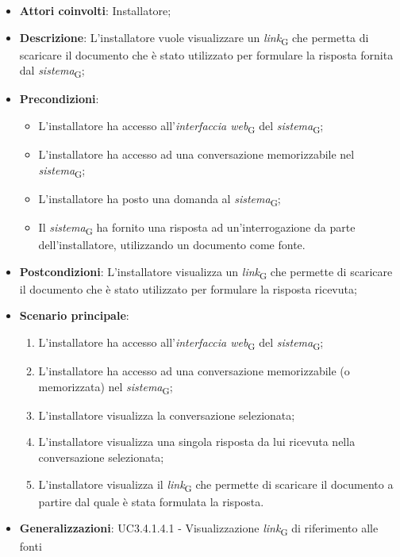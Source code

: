 \begin{itemize}
    \item \textbf{Attori coinvolti}: Installatore;
    \item \textbf{Descrizione}: L'installatore vuole visualizzare un \textit{link}\textsubscript{G} che permetta di scaricare il documento che è stato utilizzato per formulare la risposta fornita dal \textit{sistema}\textsubscript{G};
    \item \textbf{Precondizioni}: 
    \begin{itemize}
        \item L’installatore ha accesso all’\textit{interfaccia web}\textsubscript{G} del \textit{sistema}\textsubscript{G};
        \item L’installatore ha accesso ad una conversazione memorizzabile nel \textit{sistema}\textsubscript{G};
        \item L'installatore ha posto una domanda al \textit{sistema}\textsubscript{G};
        \item Il \textit{sistema}\textsubscript{G} ha fornito una risposta ad un’interrogazione da parte dell’installatore, utilizzando un documento come fonte.
    \end{itemize}
    \item \textbf{Postcondizioni}: L'installatore visualizza un \textit{link}\textsubscript{G} che permette di scaricare il documento che è stato utilizzato per formulare la risposta ricevuta;
    \item \textbf{Scenario principale}:
    \begin{enumerate}
        \item L’installatore ha accesso all’\textit{interfaccia web}\textsubscript{G} del \textit{sistema}\textsubscript{G};
        \item L’installatore ha accesso ad una conversazione memorizzabile (o memorizzata) nel \textit{sistema}\textsubscript{G};
        \item L'installatore visualizza la conversazione selezionata;
        \item L'installatore visualizza una singola risposta da lui ricevuta nella conversazione selezionata;
        \item L'installatore visualizza il \textit{link}\textsubscript{G} che permette di scaricare il documento a partire dal quale è stata formulata la risposta.
    \end{enumerate}
    \item \textbf{Generalizzazioni}: UC3.4.1.4.1 - Visualizzazione \textit{link}\textsubscript{G} di riferimento alle fonti
\end{itemize}

